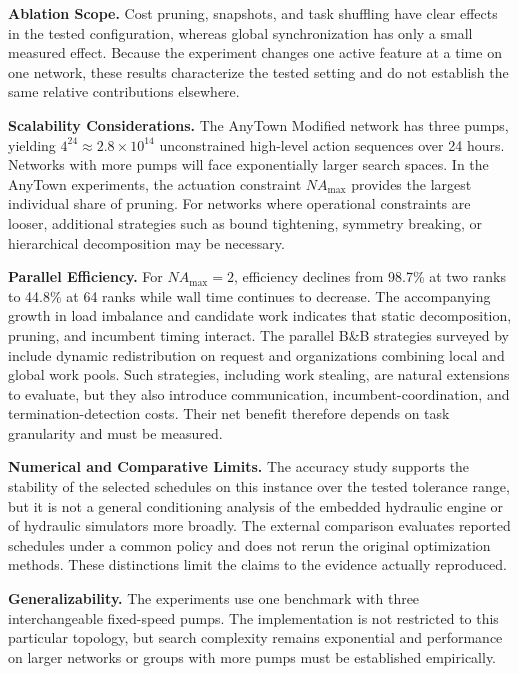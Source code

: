 \documentclass[Journal,letterpaper,InsideFigs]{ascelike-new}
\begin{document}
\textbf{Ablation Scope.} Cost pruning, snapshots, and task shuffling have clear effects in the tested configuration, whereas global synchronization has only a small measured effect. Because the experiment changes one active feature at a time on one network, these results characterize the tested setting and do not establish the same relative contributions elsewhere.

\textbf{Scalability Considerations.} The AnyTown Modified network has three pumps, yielding $4^{24} \approx 2.8 \times 10^{14}$ unconstrained high-level action sequences over 24 hours. Networks with more pumps will face exponentially larger search spaces. In the AnyTown experiments, the actuation constraint $NA_{\max}$ provides the largest individual share of pruning. For networks where operational constraints are looser, additional strategies such as bound tightening, symmetry breaking, or hierarchical decomposition may be necessary.

\textbf{Parallel Efficiency.} For $NA_{\max}=2$, efficiency declines from 98.7\% at two ranks to 44.8\% at 64 ranks while wall time continues to decrease. The accompanying growth in load imbalance and candidate work indicates that static decomposition, pruning, and incumbent timing interact. The parallel B\&B strategies surveyed by  include dynamic redistribution on request and organizations combining local and global work pools. Such strategies, including work stealing, are natural extensions to evaluate, but they also introduce communication, incumbent-coordination, and termination-detection costs. Their net benefit therefore depends on task granularity and must be measured.

\textbf{Numerical and Comparative Limits.} The accuracy study supports the stability of the selected schedules on this instance over the tested tolerance range, but it is not a general conditioning analysis of the embedded hydraulic engine or of hydraulic simulators more broadly. The external comparison evaluates reported schedules under a common policy and does not rerun the original optimization methods. These distinctions limit the claims to the evidence actually reproduced.

\textbf{Generalizability.} The experiments use one benchmark with three interchangeable fixed-speed pumps. The implementation is not restricted to this particular topology, but search complexity remains exponential and performance on larger networks or groups with more pumps must be established empirically.
\end{document}
